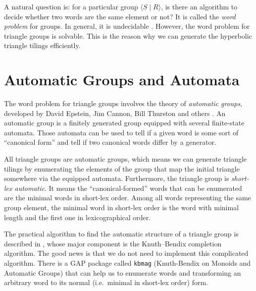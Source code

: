 \documentclass[12pt]{article}
\begin{document}
A natural question is: for a particular group $\langle S \mid R
\rangle$, is there an algorithm to decide whether two words are the
same element or not? It is called the \emph{word problem} for
groups. In general, it is undecidable
\citep{novikov1958algorithmic}. However, the word problem for triangle
groups is solvable. This is the reason why we can generate the
hyperbolic triangle tilings efficiently.

\section{Automatic Groups and Automata}
The word problem for triangle groups involves the theory of
\emph{automatic groups}, developed by David Epstein, Jim Cannon, Bill
Thurston and others \citep{epstein1992}. An automatic group is a
finitely generated group equipped with several finite-state
automata. Those automata can be used to tell if a given word is some
sort of ``canonical form'' and tell if two canonical words differ by a
generator.

All triangle groups are automatic groups, which means we can generate
triangle tilings by enumerating the elements of the group that map the
initial triangle somewhere via the equipped automata. Furthermore, the
triangle group is \emph{short-lex automatic}. It means the
``canonical-formed'' words that can be enumerated are the minimal
words in short-lex order. Among all words representing the same group
element, the minimal word in short-lex order is the word with minimal
length and the first one in lexicographical order.

The practical algorithm to find the automatic structure of a triangle
group is described in \citep{epstein1991}, whose major component is
the Knuth--Bendix completion algorithm. The good news is that we do
not need to implement this complicated algorithm. There is a GAP
\citep{GAP4} package called \verb|kbmag| (Knuth-Bendix on Monoids and
Automatic Groups) that can help us to enumerate words and transforming
an arbitrary word to its normal (i.e.\ minimal in short-lex order)
form.
\end{document}
